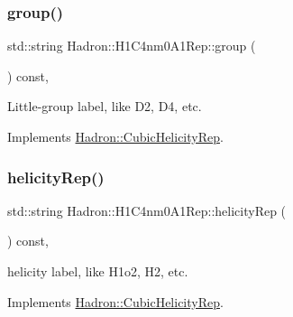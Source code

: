 \mbox{\label{structHadron_1_1H1C4nm0A1Rep_a5f7db1ef15b67eaee1c5fc81ed9ec2bd}} 
\subsubsection{\texorpdfstring{group()}{group()}\hspace{0.1cm}{\footnotesize\ttfamily [5/5]}}
{\footnotesize\ttfamily std\+::string Hadron\+::\+H1\+C4nm0\+A1\+Rep\+::group (\begin{DoxyParamCaption}{ }\end{DoxyParamCaption}) const\hspace{0.3cm}{\ttfamily [inline]}, {\ttfamily [virtual]}}

Little-\/group label, like D2, D4, etc. 

Implements \mbox{\hyperlink{structHadron_1_1CubicHelicityRep_a101a7d76cd8ccdad0f272db44b766113}{Hadron\+::\+Cubic\+Helicity\+Rep}}.

\mbox{\label{structHadron_1_1H1C4nm0A1Rep_a018d2e78677dfe6d57d9cbc95e554618}} 
\subsubsection{\texorpdfstring{helicityRep()}{helicityRep()}\hspace{0.1cm}{\footnotesize\ttfamily [1/3]}}
{\footnotesize\ttfamily std\+::string Hadron\+::\+H1\+C4nm0\+A1\+Rep\+::helicity\+Rep (\begin{DoxyParamCaption}{ }\end{DoxyParamCaption}) const\hspace{0.3cm}{\ttfamily [inline]}, {\ttfamily [virtual]}}

helicity label, like H1o2, H2, etc. 

Implements \mbox{\hyperlink{structHadron_1_1CubicHelicityRep_af1096946b7470edf0a55451cc662f231}{Hadron\+::\+Cubic\+Helicity\+Rep}}.

\mbox{\label{structHadron_1_1H1C4nm0A1Rep_a018d2e78677dfe6d57d9cbc95e554618}} 
